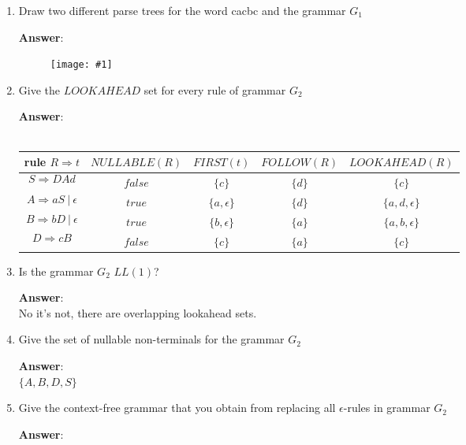 \documentclass[a4paper, 14pt]{report}
\newcommand{\centeredimg}[1]{%
	\begin{figure}[h]
		\begin{center}
			\texttt{[image: \#1]}
		\end{center}
\end{figure}}
\newcommand{\answer}[1]{%
	\textbf{Answer}:\\
#1}
\begin{document}
\begin{enumerate}[label=(\alph*)]
	\setlength\itemsep{2em}

\item Draw two different parse trees for the word cacbc and the grammar $G_{1}$

	\answer{\centeredimg{parse_trees.jpg}}

\item Give the $LOOKAHEAD$ set for every rule of grammar $G_{2}$

	\answer{%
		\\
		\begin{tabular}{ |c|c|c|c|c| }
			\hline
			rule $R \Rightarrow t$ & $NULLABLE(R)$ & $FIRST(t)$ & $FOLLOW(R)$ & $LOOKAHEAD(R)$ \\
			\hline
			\[ S \Rightarrow DAd \] & $false$ & $\{c\}$ & $\{d\}$ & $\{c\} $ \\
			\hline
			\[ A \Rightarrow aS\ |\ \epsilon \] & $true$  & $\{a, \epsilon\}$ & $\{d\}$ & $\{a, d, \epsilon\}$  \\
			\hline 
			\[ B \Rightarrow bD\ |\ \epsilon \] & $true$ & $\{b, \epsilon\}$ & $\{a\}$ & $\{a, b, \epsilon\}$ \\ 
			\hline
			\[ D \Rightarrow cB \] &$false$ & $\{c\}$ & $\{a\}$ & $\{c\}$ \\
			\hline
	\end{tabular}}

\item Is the grammar $G_{2}$ $LL(1)$?

	\answer{No it's not, there are overlapping lookahead sets.}

\item Give the set of nullable non-terminals for the grammar $G_{2}$

	\answer{$\{A, B, D, S\}$}

\item Give the context-free grammar that you obtain from replacing all $\epsilon$-rules in grammar $G_{2}$

	\answer{%

		\begin{multicols}{2}

			\begin{center} 


\end{center}
\end{multicols}}
\end{enumerate}
\end{document}
